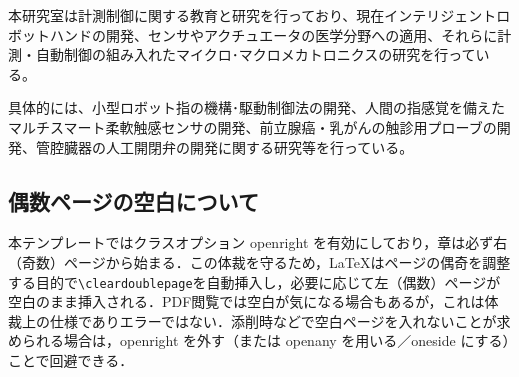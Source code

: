 \documentclass[../main.tex]{subfiles} %
\begin{document}
本研究室は計測制御に関する教育と研究を行っており、現在インテリジェントロボットハンドの開発、センサやアクチュエータの医学分野への適用、それらに計測・自動制御の組み入れたマイクロ･マクロメカトロニクスの研究を行っている。

具体的には、小型ロボット指の機構･駆動制御法の開発、人間の指感覚を備えたマルチスマート柔軟触感センサの開発、前立腺癌・乳がんの触診用プローブの開発、管腔臓器の人工開閉弁の開発に関する研究等を行っている。

\subsection{偶数ページの空白について}
本テンプレートではクラスオプション openright を有効にしており，章は必ず右（奇数）ページから始まる．この体裁を守るため，\LaTeX はページの偶奇を調整する目的で\verb|\cleardoublepage|を自動挿入し，必要に応じて左（偶数）ページが空白のまま挿入される．PDF閲覧では空白が気になる場合もあるが，これは体裁上の仕様でありエラーではない．添削時などで空白ページを入れないことが求められる場合は，openright を外す（または openany を用いる／oneside にする）ことで回避できる．


\end{document}
